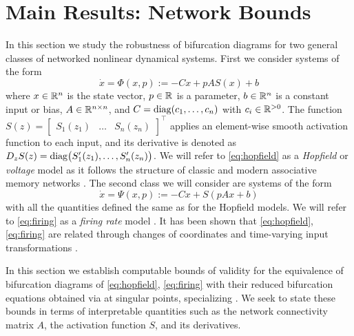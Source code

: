 \documentclass[letterpaper, 10 pt, conference]{ieeeconf}
\begin{document}

\section{Main Results: Network Bounds}
\label{sec:results}

In this section we study the robustness of bifurcation diagrams for two general classes of networked nonlinear dynamical systems.
First we consider systems of the form
\begin{equation}
    \dot{x} = \Phi(x,p) := -Cx + pAS(x) + b \label{eq:hopfield}
\end{equation}
where \(x \in \R[n]\) is the state vector, \(p \in \R[]\) is a parameter, \(b \in \R[n]\) is a constant input or bias, \(A \in \R[n \times n]\), and \(C=\diag(c_1,\dots,c_n)\) with \(c_i \in \R[>0]\). The function \(S(z) = \begin{bmatrix} S_1(z_1) & \dots & S_n(z_n) \end{bmatrix}^{\top}\) applies an element-wise smooth activation function to each input, and its derivative is denoted as \(D_{z}S(z) = \diag\bigl(S'_1(z_1), \dots, S'_n(z_n)\bigr)\). We will refer to \eqref{eq:hopfield} as a \emph{Hopfield} or \emph{voltage} model as it follows the structure of classic and modern associative memory networks \cite{hopfield1984neurons,betteti2025input}.
The second class we will consider are systems of the form
\begin{equation}
    \dot{x} = \Psi(x,p) := -Cx + S(pAx + b) \label{eq:firing}
\end{equation}
with all the quantities defined the same as for the Hopfield models. We will refer to \eqref{eq:firing} as a \emph{firing rate} model \cite{wilson1972excitatory,betteti2025firing}. It has been shown that \eqref{eq:hopfield}, \eqref{eq:firing} are related through changes of coordinates and time-varying input transformations \cite{miller2012mathematical}.

In this section we establish computable bounds of validity for the equivalence of bifurcation diagrams of \eqref{eq:hopfield}, \eqref{eq:firing} with their reduced bifurcation equations obtained via \LSR{} at singular points, specializing . We seek to state these bounds in terms of interpretable quantities such as the network connectivity matrix \(A\), the activation function \(S\), and its derivatives.

\end{document}
